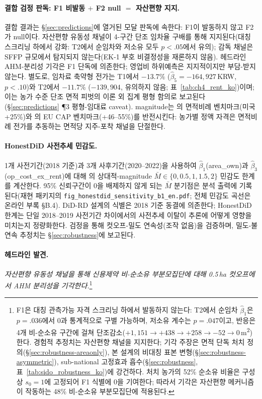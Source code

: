 \documentclass[12pt, a4paper]{article}
\begin{document}
\paragraph{결합 검정 판독: F1 비발동 $+$ F2 null $=$ 자산편향 지지.} 결합 결과는 \S\ref{sec:predictions}에 열거된 모달 판독에 속한다: F1이 발동하지 않고 F2가 null이다. 자산편향 유동성 채널이 4-구간 단조 임차율 구배를 통해 지지된다(대칭 스크리닝 하에서 강화: T2에서 순임차와 저소유 모두 $p < .05$에서 유의); 감독 채널은 SFFP 규모에서 탐지되지 않는다(EK-1 부호 비결정성을 재론하지 않음). 헤드라인 AHM-분리성 기각은 F1 단독에 의존한다; 영업비 하위예측은 지지적이지만 부담-받지 않는다. 별도로, 임차료 축약형 전가는 T1에서 $-13.7\%$ ($\hat\beta_5 = -164{,}927$\,KRW, $p < .10$)와 T2에서 $-11.7\%$ ($-139{,}904$, 유의하지 않음; 표~\ref{tab:ch4_rent_ko})이며; 이는 농가 수준 단조 면적 피벗의 이론 외 집계 평형 함의로 보고된다(\S\ref{sec:predictions} ¶3 평형-임대료 caveat). magnitude는 \citet{Kirwan2009_rentcap}의 면적비례 벤치마크(미국 +25\%)와 \citet{BaldoniCiaian2023_eucap}의 EU CAP 벤치마크(+46--55\%)를 반전시킨다: 농가별 정액 자격은 면적비례 전가를 추동하는 면적당 지주-포착 채널을 단절한다.



\paragraph{HonestDiD 사전추세 민감도.} 1개 사전기간(2018 기준)과 3개 사후기간(2020--2022)을 사용하여 $\hat\beta_1$(area\_own)과 $\hat\beta_3$(op\_cost\_ex\_rent)에 대해 \citet{RambachanRoth2023_honestdid}의 상대적-magnitude $\bar M \in \{0, 0.5, 1, 1.5, 2\}$ 민감도 한계를 계산한다. 95\% 신뢰구간이 0을 배제하지 않게 되는 $\bar M$ 분기점은 분석 출력에 기록된다(재현 패키지의 \texttt{fig\_honestdid\_sensitivity\_b1\_en.pdf}; 전체 민감도 곡선은 온라인 부록 \S B.4). DiD-RD 설계의 식별은 2018 기준 동결에 의존한다; HonestDiD 한계는 단일 2018--2019 사전기간 차이에서의 사전추세 이탈이 추론에 어떻게 영향을 미치는지 정량화한다. \citet{McCrary2008_density} 검정을 통해 컷오프-밀도 연속성(조작 없음)을 검증하며, 밀도-불연속 추정치는 \S\ref{sec:robustness}에 보고된다.

\paragraph{헤드라인 발견.} \textit{자산편향 유동성 채널을 통해 신용제약 비-순소유 부분모집단에 대해 0.5\,ha 컷오프에서 AHM 분리성을 기각한다.}\footnote{F1은 대칭 관측가능 자격 스크리닝 하에서 발동하지 않는다: T2에서 순임차 $\hat\beta_1$은 $p = .036$에서 0과 통계적으로 구별 가능하며, 저소유 계수는 $p = .047$이고, 반응은 4개 비-순소유 구간에 걸쳐 단조감소($+1{,}151 \to +438 \to +258 \to -52 \to 0$\,m\textsuperscript{2})한다. 경험적 추정치는 자산편향 채널을 지지한다; 기각 주장은 면적 단독 처치 정의(\S\ref{sec:robustness-areaonly}), 본 설계의 비대칭 표본 변형(\S\ref{sec:robustness-asymmetric}), sub-national 고정효과 흡수(\S\ref{sec:robustness}, 표~\ref{tab:sido_robustness_ko})에 강건하다. 처치 농가의 52\% 순소유 비율은 구성상 $s_0 = 1$에 고정되어 F1 식별에 0을 기여한다; 따라서 기각은 자산편향 메커니즘이 작동하는 48\% 비-순소유 부분모집단에 적용된다.}
\end{document}

